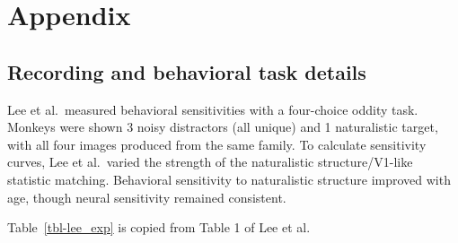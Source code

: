 \documentclass[
  11pt,
  letterpaper,
  DIV=11,
  numbers=noendperiod]{scrartcl}
\begin{document}
\newpage{}

\section{Appendix}\label{appendix}

\subsection{Recording and behavioral task details}\label{sec-behavior}

Lee et al.~measured behavioral sensitivities with a four-choice oddity
task. Monkeys were shown 3 noisy distractors (all unique) and 1
naturalistic target, with all four images produced from the same family.
To calculate sensitivity curves, Lee et al.~varied the strength of the
naturalistic structure/V1-like statistic matching. Behavioral
sensitivity to naturalistic structure improved with age, though neural
sensitivity remained consistent.

Table~\ref{tbl-lee_exp} is copied from Table 1 of Lee et al.~
\end{document}
